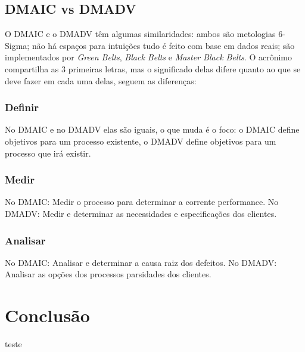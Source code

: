 \documentclass{abnt}
\begin{document}
			\section {DMAIC vs DMADV}
				O DMAIC e o DMADV têm algumas similaridades: ambos são metologias 6-Sigma; não há espaços para intuições 
				tudo é feito com base em dados reais; são implementados por \textit{Green Belts}, \textit{Black Belts} e \textit{Master Black Belts}.
				O acrônimo compartilha as 3 primeiras letras, mas o significado delas difere quanto ao que se deve fazer em cada uma delas, 
				seguem as diferenças:
				\subsection {Definir}
				No DMAIC e no DMADV elas são iguais, o que muda é o foco: o DMAIC define objetivos para um processo existente, 
				o DMADV define objetivos para um processo que irá existir.
				\subsection {Medir}
				No DMAIC: Medir o processo para determinar a corrente performance.
				No DMADV: Medir e determinar as necessidades e especificações dos clientes.
				\subsection {Analisar}
				No DMAIC: Analisar e determinar a causa raiz dos defeitos. 
				No DMADV: Analisar as opções dos processos parsidades dos clientes.
	
	\chapter {Conclusão}
	
	\begin{thebibliography}{99}
		 teste
	\end{thebibliography}
\end{document}
